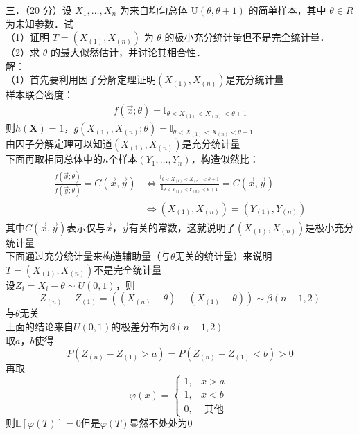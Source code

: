 \documentclass[UTF8,openany]{book}
\begin{document}
	
	\noindent 三．（20 分）设 $X_{1}, \ldots, X_{n}$ 为来自均匀总体 $\mathrm{U}(\theta, \theta+1)$ 的简单样本，其中 $\theta \in R$ 为未知参数．试\\
	（1）证明 $T=\left(X_{(1)}, X_{(n)}\right)$ 为 $\theta$ 的极小充分统计量但不是完全统计量．\\
	（2）求 $\theta$ 的最大似然估计，并讨论其相合性．\\
	解：\\
	（1）首先要利用因子分解定理证明$(X_{(1)},X_{(n)})$是充分统计量\\
	样本联合密度：\\
	\begin{gather}
		f(\vec{x};\theta) = \mathbb{I}_{\theta < X_{(1)} < X_{(n)} < \theta + 1}
	\end{gather}
	则$h(\boldsymbol{X})=1$，$g(X_{(1)},X_{(n)};\theta)=\mathbb{I}_{\theta < X_{(1)} < X_{(n)} < \theta + 1}$\\
	由因子分解定理可以知道$(X_{(1)},X_{(n)})$是充分统计量\\
	下面再取相同总体中的$n$个样本$(Y_1,\dots,Y_n)$，构造似然比：
	\begin{gather}
		\begin{aligned}
			\frac{f(\vec{x};\theta)}{f(\vec{y};\theta)}=C(\vec{x},\vec{y})& \iff \frac{\mathbb{I}_{\theta < X_{(1)} < X_{(n)} < \theta + 1}}{\mathbb{I}_{\theta < Y_{(1)} < Y_{(n)} < \theta + 1}}=C(\vec{x},\vec{y}) \\
			&\iff (X_{(1)},X_{(n)})=(Y_{(1)},Y_{(n)})
		\end{aligned}
	\end{gather}
	其中$C(\vec{x},\vec{y})$表示仅与$\vec{x}$，$\vec{y}$有关的常数，这就说明了$(X_{(1)},X_{(n)})$是极小充分统计量\\
	下面通过充分统计量来构造辅助量（与$\theta$无关的统计量）来说明$T=(X_{(1)},X_{(n)})$不是完全统计量\\
	设$Z_i=X_i-\theta \sim U(0,1)$，则
	$$Z_{(n)}-Z_{(1)}=((X_{(n)}-\theta)-(X_{(1)}-\theta)) \sim \beta(n-1,2)$$
	与$\theta$无关\\
	上面的结论来自$U(0,1)$的极差分布为$\beta(n-1,2)$\\
	取$a$，$b$使得
	$$P(Z_{(n)}-Z_{(1)}>a)=P(Z_{(n)}-Z_{(1)}<b)>0$$
	再取
	$$\varphi(x)= \begin{cases}1, & x>a \\ 1, & x<b \\ 0, & \text { 其他 }\end{cases}$$
	则$\mathbb{E}[\varphi(T)]=0$但是$\varphi(T)$显然不处处为$0$\\
\end{document}

